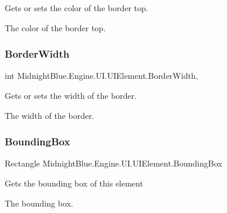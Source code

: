 Gets or sets the color of the border top. 

The color of the border top.\hypertarget{class_midnight_blue_1_1_engine_1_1_u_i_1_1_u_i_element_ab3b26497b32ce0c7f474898e7bd1ea8e}{}\label{class_midnight_blue_1_1_engine_1_1_u_i_1_1_u_i_element_ab3b26497b32ce0c7f474898e7bd1ea8e} 
\subsubsection{\texorpdfstring{Border\+Width}{BorderWidth}}
{\footnotesize\ttfamily int Midnight\+Blue.\+Engine.\+U\+I.\+U\+I\+Element.\+Border\+Width\hspace{0.3cm}{\ttfamily [get]}, {\ttfamily [set]}}



Gets or sets the width of the border. 

The width of the border.\hypertarget{class_midnight_blue_1_1_engine_1_1_u_i_1_1_u_i_element_a28bf82f271376162bab18a758871aca1}{}\label{class_midnight_blue_1_1_engine_1_1_u_i_1_1_u_i_element_a28bf82f271376162bab18a758871aca1} 
\subsubsection{\texorpdfstring{Bounding\+Box}{BoundingBox}}
{\footnotesize\ttfamily Rectangle Midnight\+Blue.\+Engine.\+U\+I.\+U\+I\+Element.\+Bounding\+Box\hspace{0.3cm}{\ttfamily [get]}}



Gets the bounding box of this element 

The bounding box.\hypertarget{class_midnight_blue_1_1_engine_1_1_u_i_1_1_u_i_element_a82648add05ebacdf8a2b47317b97e827}{}\label{class_midnight_blue_1_1_engine_1_1_u_i_1_1_u_i_element_a82648add05ebacdf8a2b47317b97e827} 
